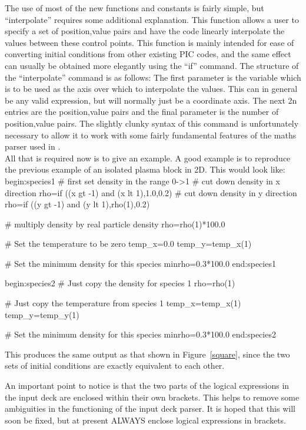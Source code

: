 \documentclass[12pt,a4paper]{article}
\newcommand{\EPOCH}{{\color{warwickdark}\fontfamily{phv}\selectfont{EPOCH}}}
\newenvironment{boxverbatim}{\lboxverbatim{none}}{\endlboxverbatim}
\begin{document}
The use of most of the new functions and constants is fairly simple, but
``interpolate'' requires some additional explanation. This function allows a
user to specify a set of position,value pairs and have the code linearly
interpolate the values between these control points. This function is mainly
intended for ease of converting initial conditions from other existing PIC
codes, and the same effect can usually be obtained more elegantly using the
``if'' command. The structure of the ``interpolate'' command is as follows:
The first parameter is the variable which is to be used as the axis over which
to interpolate the values. This can in general be any valid expression, but
will normally just be a coordinate axis. The next 2n entries are the
position,value pairs and the final parameter is the number of position,value
pairs. The slightly clunky syntax of this command is unfortunately necessary to
allow it to work with some fairly fundamental features of the maths parser
used in {\EPOCH}.\\
All that is required now is to give an example. A good example is to reproduce
the previous example of an isolated plasma block in 2D. This would look like:
\begin{boxverbatim}
begin:species1
   # first set density in the range 0->1
   # cut down density in x direction
   rho=if ((x gt -1) and (x lt 1),1.0,0.2)
   # cut down density in y direction
   rho=if ((y gt -1) and (y lt 1),rho(1),0.2)

   # multiply density by real particle density
   rho=rho(1)*100.0

   # Set the temperature to be zero
   temp_x=0.0
   temp_y=temp_x(1)

   # Set the minimum density for this species
   minrho=0.3*100.0
end:species1

begin:species2
   # Just copy the density for species 1
   rho=rho(1)

   # Just copy the temperature from species 1
   temp_x=temp_x(1)
   temp_y=temp_y(1)

   # Set the minimum density for this species
   minrho=0.3*100.0
end:species2
\end{boxverbatim}

This produces the same output as that shown in Figure~\ref{square}, since
the two sets of initial conditions are exactly equivalent to each other.

An important point to notice is that the two parts of the logical expressions
in the input deck are enclosed within their own brackets. This helps to remove
some ambiguities in the functioning of the input deck parser. It is hoped that
this will soon be fixed, but at present ALWAYS enclose logical expressions in
brackets.
\end{document}
